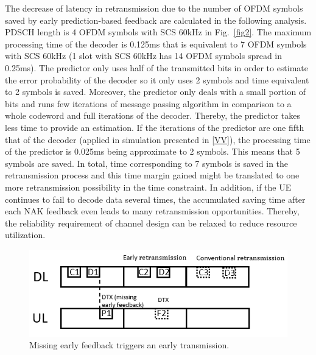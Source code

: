 \documentclass[conference]{IEEEtran}
\begin{document}
The decrease of latency in retransmission due to the number of OFDM symbols saved by early prediction-based feedback are calculated in the following analysis. PDSCH length is 4 OFDM symbols with SCS 60kHz in Fig.~\ref{fig2}. The maximum processing time of the decoder is 0.125ms that is equivalent to 7 OFDM symbols with SCS 60kHz (1 slot with SCS 60kHz has 14 OFDM symbols spread in 0.25ms). The predictor only uses half of the transmitted bits in order to estimate the error probability of the decoder so it only uses 2 symbols and time equivalent to 2 symbols is saved. Moreover, the predictor only deals with a small portion of bits and runs few iterations of message passing algorithm in comparison to a whole codeword and full iterations of the decoder. Thereby, the predictor takes less time to provide an estimation. If the iterations of the predictor are one fifth that of the decoder (applied in simulation presented in \ref{VV}), the processing time of the predictor is 0.025ms being approximate to 2 symbols. This means that 5 symbols are saved. In total, time corresponding to 7 symbols is saved in the retransmission process and this time margin gained  might be translated  to  one more  retransmission  possibility  in the time constraint. In addition, if the UE continues to fail to decode data several times, the accumulated saving time after each NAK feedback even leads to many retransmission opportunities.  Thereby,  the reliability  requirement  of  channel  design  can  be  relaxed to  reduce  resource  utilization. 
\begin{figure}[htbp]
\centerline{\includegraphics[scale=0.45]{fig3.png}}
\caption{Missing early feedback triggers an early transmission.}
\label{fig3}
\end{figure}
\end{document}
